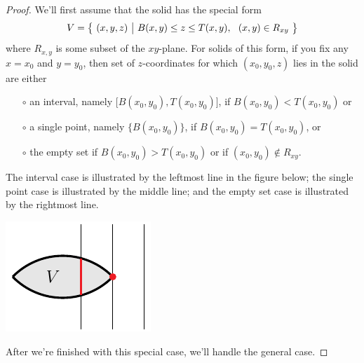 \begin{proof}
{We'll first assume that the solid has the special form
\begin{equation*}
V = \big\{ \ (x,y,z)\ \big|\  B(x,y)\le z\le T(x,y),\ \ (x,y)\in R_{xy}\ \big\}
\end{equation*}
where $R_{x,y}$ is some subset of the $xy$-plane. 
For solids of this form, if you fix any $x=x_0$ and $y=y_0$,
then set of $z$-coordinates for which $(x_0,y_0,z)$ lies in the solid
are either 
\begin{itemize}\itemsep1pt \parskip0pt  %
\item[$\circ$]
an interval, namely $\big[B(x_0,y_0), T(x_0,y_0)\big]$,
if $B(x_0,y_0)< T(x_0,y_0)$ or
\item[$\circ$]
a single point, namely $\big\{B(x_0,y_0)\big\}$,
if $B(x_0,y_0)= T(x_0,y_0)$, or
\item[$\circ$] the empty set if $B(x_0,y_0)> T(x_0,y_0)$
or if $(x_0,y_0)\notin R_{xy}$.
\end{itemize}
The interval case is illustrated by the leftmost line in the figure below;
the single point case is illustrated by the middle line; and the empty set
case is illustrated by the rightmost line.
\begin{nfig}
\begin{center}
    \includegraphics{divSpec.pdf}
\end{center}
\end{nfig}
\noindent
After we're finished with this special case, we'll handle the general case.
}


\end{proof}
